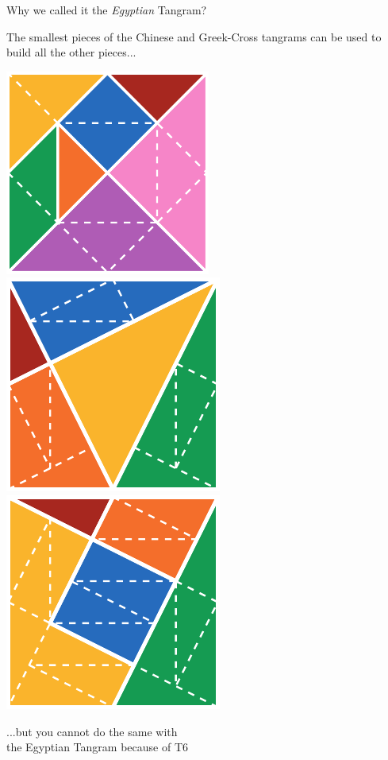 \documentclass[14pt]{beamer}
\begin{document}

        \begin{frame}{Why we called it the \emph{Egyptian} Tangram?}
        \begin{center}
            The smallest pieces of the Chinese and Greek-Cross tangrams can be used to build all the other pieces...

            \bigskip \bigskip

            \includegraphics[height=15ex]{figures/figure003c.pdf}\quad\includegraphics[height=15ex]{figures/figure003a.pdf}\quad\includegraphics[height=15ex]{figures/figure003b.pdf} \\

            \bigskip \bigskip

            ...but you cannot do the same with\\the Egyptian Tangram because of T6
        \end{center}
    \end{frame}

\end{document}

